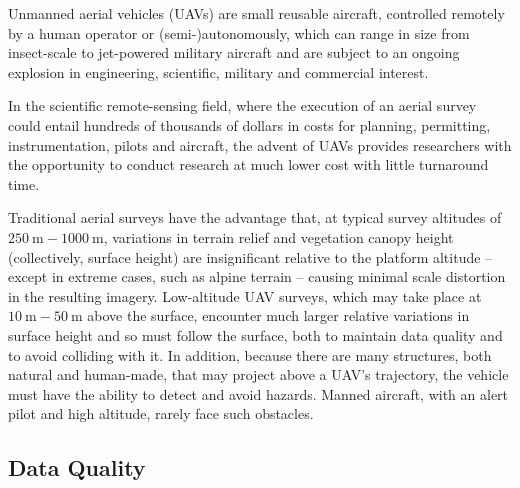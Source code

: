 \documentclass[doc]{apa6}
\begin{document}
Unmanned aerial vehicles (UAVs) are small reusable aircraft, controlled remotely by a human operator or (semi-)autonomously, which can range in size from insect-scale to jet-powered military aircraft \parencite{Avadhanula2002,Deng2003} and are subject to an ongoing explosion in engineering, scientific, military and commercial interest. 



In the scientific remote-sensing field, where the execution of an aerial survey could entail hundreds of thousands of dollars in costs for planning, permitting, instrumentation, pilots and aircraft, the advent of UAVs provides researchers with the opportunity to conduct research at much lower cost with little turnaround time. 

Traditional aerial surveys have the advantage that, at typical survey altitudes of $\SI{250}\m-\SI{1000}\m$, variations in terrain relief and vegetation canopy height (collectively, surface height) are insignificant relative to the platform altitude -- except in extreme cases, such as alpine terrain -- causing minimal scale distortion in the resulting imagery. Low-altitude UAV surveys, which may take place at $\SI{10}\m-\SI{50}\m$ above the surface, encounter much larger relative variations in surface height and so must follow the surface, both to maintain data quality and to avoid colliding with it. In addition, because there are many structures, both natural and human-made, that may project above a UAV's trajectory, the vehicle must have the ability to detect and avoid hazards. Manned aircraft, with an alert pilot and high altitude, rarely face such obstacles. 


\subsection{Data Quality}
\end{document}
